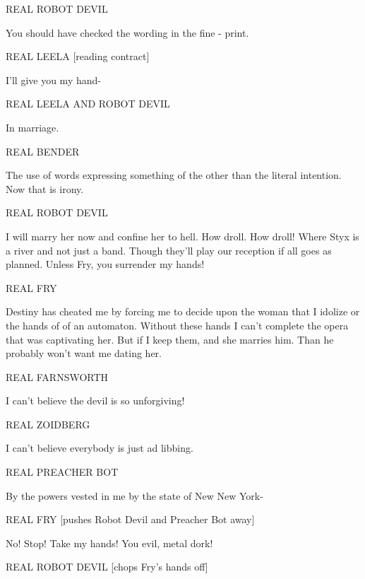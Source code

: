 \documentclass[12pt]{article}
\begin{document}
REAL ROBOT DEVIL

You should have checked the wording in the fine - print.

REAL LEELA [reading contract]

I'll give you my hand-

REAL LEELA AND ROBOT DEVIL

In marriage.

REAL BENDER

The use of words expressing something of the other than the literal intention.
Now that is irony.

REAL ROBOT DEVIL

I will marry her now and confine her to hell.
How droll. How droll!
Where Styx is a river and not just a band.
Though they'll play our reception if all goes as planned.
Unless Fry, you surrender my hands!

REAL FRY

Destiny has cheated me
by forcing me to decide upon
the woman that I idolize
or the hands of of an automaton.
Without these hands I can't complete
the opera that was captivating her.
But if I keep them, and she marries him.
Than he probably won't want me dating her.

REAL FARNSWORTH

I can't believe the devil is so unforgiving!

REAL ZOIDBERG

I can't believe everybody is just ad libbing.

REAL PREACHER BOT

By the powers vested in me by the state of New New York-

REAL FRY [pushes Robot Devil and Preacher Bot away]

No! Stop! Take my hands!
You evil, metal dork!

REAL ROBOT DEVIL [chops Fry's hands off]
\end{document}
